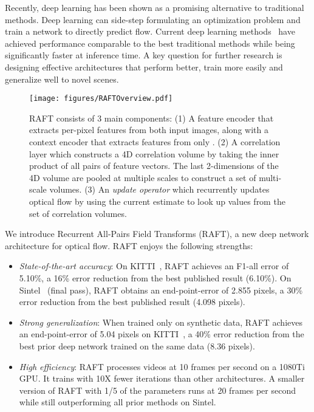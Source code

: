 \documentclass[runningheads]{llncs}
\begin{document}
Recently, deep learning has been shown as a promising alternative to traditional methods. Deep learning can side-step formulating an optimization problem and train a network to directly predict flow. Current deep learning methods~\cite{ilg2017flownet,pwcnet,liteflownet,vcn,flowelements} have achieved performance comparable to the best traditional methods while being significantly faster at inference time. A key question for further research is designing effective architectures that perform better, train more easily and generalize well to novel scenes. 

\begin{figure}[t]
	\begin{center}
		\texttt{[image: figures/RAFTOverview.pdf]}
	\end{center}
	\caption{RAFT consists of 3 main components: (1) A feature encoder that extracts per-pixel features from both input images, along with a context encoder that extracts features from only . (2) A correlation layer which constructs a 4D  correlation volume by taking the inner product of all pairs of feature vectors. The last 2-dimensions of the 4D volume are pooled at multiple scales to construct a set of multi-scale volumes. (3) An \emph{update operator} which recurrently updates optical flow by using the current estimate to look up values from the set of correlation volumes.}
	\label{fig:Method}
\end{figure}


We introduce Recurrent All-Pairs Field Transforms (RAFT), a new deep network architecture for optical flow. RAFT enjoys the following strengths: 
\begin{itemize}
    \item \emph{State-of-the-art accuracy}: On KITTI~\cite{kitti}, RAFT achieves an F1-all error of 5.10\%, a 16\% error reduction from the best published result (6.10\%). On Sintel~\cite{sintel} (final pass), RAFT obtains an end-point-error of 2.855 pixels, a 30\% error reduction from the best published result (4.098 pixels). 
    \item \emph{Strong generalization}: When trained only on synthetic data, RAFT achieves an end-point-error of 5.04 pixels on KITTI~\cite{kitti}, a 40\% error reduction from the best prior deep network trained on the same data (8.36 pixels). 
    \item \emph{High efficiency}: RAFT processes  videos at 10 frames per second on a 1080Ti GPU. It trains with 10X fewer iterations than other architectures. A smaller version of RAFT with 1/5 of the parameters runs at 20 frames per second while still outperforming all prior methods on Sintel. 
\end{itemize} 
\end{document}
